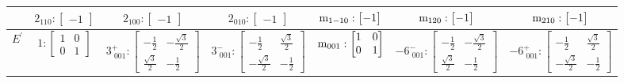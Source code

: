 \documentclass[fleqn,8pt,landscape]{jsarticle}
\begin{document}
\begin{longtable}{ccccccc}
& $ 2{}_{110}:\begin{bmatrix} -1 \end{bmatrix} $ & $ 2{}_{100}:\begin{bmatrix} -1 \end{bmatrix} $ & $ 2{}_{010}:\begin{bmatrix} -1 \end{bmatrix} $ & $ {\rm m}_{1-10}:\begin{bmatrix} -1 \end{bmatrix} $ & $ {\rm m}_{120}:\begin{bmatrix} -1 \end{bmatrix} $ & $ {\rm m}_{210}:\begin{bmatrix} -1 \end{bmatrix} $ \\ \hline
$ E^{\prime} $ & $ 1:\begin{bmatrix} 1 & 0 \\ 0 & 1 \end{bmatrix} $ & $ 3^{+}_{\,\,001}:\begin{bmatrix} - \frac{1}{2} & - \frac{\sqrt{3}}{2} \\ \frac{\sqrt{3}}{2} & - \frac{1}{2} \end{bmatrix} $ & $ 3^{-}_{\,\,001}:\begin{bmatrix} - \frac{1}{2} & \frac{\sqrt{3}}{2} \\ - \frac{\sqrt{3}}{2} & - \frac{1}{2} \end{bmatrix} $ & $ {\rm m}_{001}:\begin{bmatrix} 1 & 0 \\ 0 & 1 \end{bmatrix} $ & $ -6^{-}_{\,\,001}:\begin{bmatrix} - \frac{1}{2} & - \frac{\sqrt{3}}{2} \\ \frac{\sqrt{3}}{2} & - \frac{1}{2} \end{bmatrix} $ & $ -6^{+}_{\,\,001}:\begin{bmatrix} - \frac{1}{2} & \frac{\sqrt{3}}{2} \\ - \frac{\sqrt{3}}{2} & - \frac{1}{2} \end{bmatrix} $ \\

\end{longtable}
\end{document}
